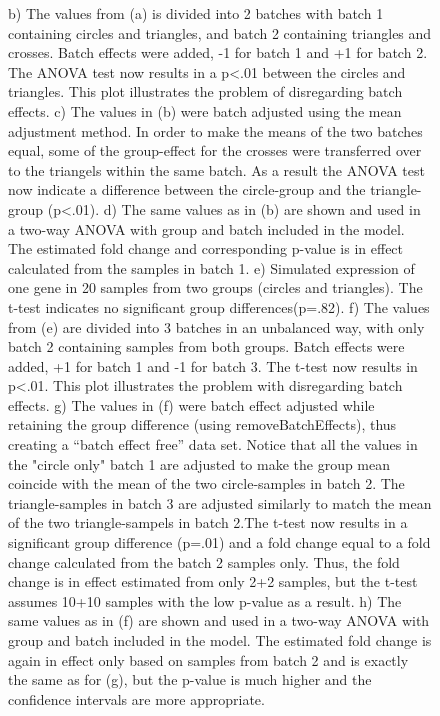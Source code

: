 \documentclass[oupdraft]{bio}
\begin{document}
\begin{figure}[!p]
{b) The values from (a) is divided into 2 batches with batch 1 containing circles and triangles, and batch 2 containing triangles and crosses. Batch effects were added, -1 for batch 1 and +1 for batch 2. The ANOVA test now results in a p<.01 between the circles and triangles. This plot illustrates the problem of disregarding batch effects.
c) The values in (b) were batch adjusted using the mean adjustment method. In order to make the means of the two batches equal, some of the group-effect for the crosses were transferred over to the triangels within the same batch. As a result the ANOVA test now indicate a difference between the circle-group and the triangle-group (p<.01).
d) The same values as in (b) are shown and used in a two-way ANOVA with group and batch included in the model. The estimated fold change and corresponding p-value is in effect calculated from the samples in batch 1.
e) Simulated expression of one gene in 20 samples from two groups (circles and triangles). The t-test indicates no significant group differences(p=.82).
f) The values from (e) are divided into 3 batches in an unbalanced way, with only batch 2 containing samples from both groups. Batch effects were added, +1 for batch 1 and -1 for batch 3. The t-test now results in p<.01. This plot illustrates the problem with disregarding batch effects.
g) The values in (f) were batch effect adjusted while retaining the group difference (using removeBatchEffects), thus creating a ``batch effect free'' data set. Notice that all the values in the "circle only" batch 1 are adjusted to make the group mean coincide with the mean of the two circle-samples in batch 2. The triangle-samples in batch 3 are adjusted similarly to match the mean of the two triangle-sampels in batch 2.The t-test now results in a significant group difference (p=.01) and a fold change equal to a fold change calculated from the batch 2 samples only. Thus, the fold change is in effect estimated from only 2+2 samples, but the t-test assumes 10+10 samples with the low p-value as a result.
h) The same values as in (f) are shown and used in a two-way ANOVA with group and batch included in the model. The estimated fold change is again in effect only based on samples from batch 2 and is exactly the same as for (g), but the p-value is much higher and the confidence intervals are more appropriate.
}
\label{fig:boxplots_v3}
\end{figure}
\end{document}
